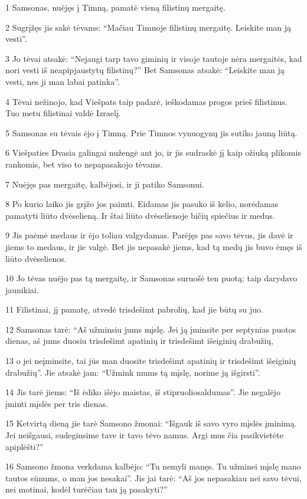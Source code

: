 \par 1 Samsonas, nuėjęs į Timną, pamatė vieną filistinų mergaitę. 
\par 2 Sugrįžęs jis sakė tėvams: “Mačiau Timnoje filistinų mergaitę. Leiskite man ją vesti”. 
\par 3 Jo tėvai atsakė: “Nejaugi tarp tavo giminių ir visoje tautoje nėra mergaitės, kad nori vesti iš neapipjaustytų filistinų?” Bet Samsonas atsakė: “Leiskite man ją vesti, nes ji man labai patinka”. 
\par 4 Tėvai nežinojo, kad Viešpats taip padarė, ieškodamas progos prieš filistinus. Tuo metu filistinai valdė Izraelį. 
\par 5 Samsonas su tėvais ėjo į Timną. Prie Timnos vynuogynų jis sutiko jauną liūtą. 
\par 6 Viešpaties Dvasia galingai nužengė ant jo, ir jis sudraskė jį kaip ožiuką plikomis rankomis, bet viso to nepapasakojo tėvams. 
\par 7 Nuėjęs pas mergaitę, kalbėjosi, ir ji patiko Samsonui. 
\par 8 Po kurio laiko jis grįžo jos paimti. Eidamas jis pasuko iš kelio, norėdamas pamatyti liūto dvėselieną. Ir štai liūto dvėselienoje bičių spiečius ir medus. 
\par 9 Jis paėmė medaus ir ėjo toliau valgydamas. Parėjęs pas savo tėvus, jis davė ir jiems to medaus, ir jie valgė. Bet jis nepasakė jiems, kad tą medų jis buvo ėmęs iš liūto dvėselienos. 
\par 10 Jo tėvas nuėjo pas tą mergaitę, ir Samsonas suruošė ten puotą; taip darydavo jaunikiai. 
\par 11 Filistinai, jį pamatę, atvedė trisdešimt pabrolių, kad jie būtų su juo. 
\par 12 Samsonas tarė: “Aš užminsiu jums mįslę. Jei ją įminsite per septynias puotos dienas, aš jums duosiu trisdešimt apatinių ir trisdešimt išeiginių drabužių, 
\par 13 o jei neįminsite, tai jūs man duosite trisdešimt apatinių ir trisdešimt išeiginių drabužių”. Jie atsakė jam: “Užmink mums tą mįslę, norime ją išgirsti”. 
\par 14 Jis tarė jiems: “Iš ėdiko išėjo maistas, iš stipruolio­saldumas”. Jie negalėjo įminti mįslės per tris dienas. 
\par 15 Ketvirtą dieną jie tarė Samsono žmonai: “Išgauk iš savo vyro mįslės įminimą. Jei neišgausi, sudeginsime tave ir tavo tėvo namus. Argi mus čia pasikvietėte apiplėšti?” 
\par 16 Samsono žmona verkdama kalbėjo: “Tu nemyli manęs. Tu užminei mįslę mano tautos sūnums, o man jos nesakai”. Jis jai tarė: “Aš jos nepasakiau nei savo tėvui, nei motinai, kodėl turėčiau tau ją pasakyti?” 
